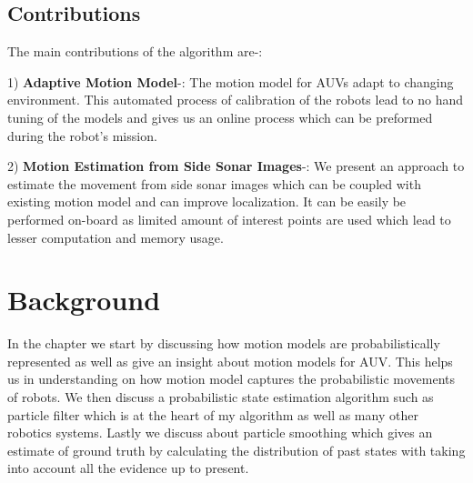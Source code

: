 \documentclass[12pt,draft]{dalcsthesis}
\begin{document}

 

\section{Contributions}
The main contributions of the algorithm are-:

1) \textbf{Adaptive Motion Model}-: The motion model for AUVs adapt to changing environment. This automated process of calibration of the robots lead to no hand tuning of the models and gives us an online process which can be preformed during the robot's mission.  

2) \textbf{Motion Estimation from Side Sonar Images}-: We present an approach to estimate the movement from side sonar images which can be coupled with existing motion model and can improve localization. It can be easily be performed on-board as limited amount of interest points are used which lead to lesser computation and memory usage. 

\chapter{Background}
In the chapter we start by discussing how motion models are probabilistically represented as well as give an insight about motion models for AUV. This helps us in understanding on how motion model captures the probabilistic movements of robots. We then discuss a probabilistic state estimation algorithm such as particle filter \cite{ristic2004beyond} \cite{chen2003bayesian} which is at the heart of my algorithm as well as many other robotics systems. Lastly we discuss about particle smoothing \cite{doucet2000monte} \cite{doucet2009tutorial} which gives an estimate of ground truth by calculating the distribution of past states with taking into account all the evidence up to present. 
\end{document}

